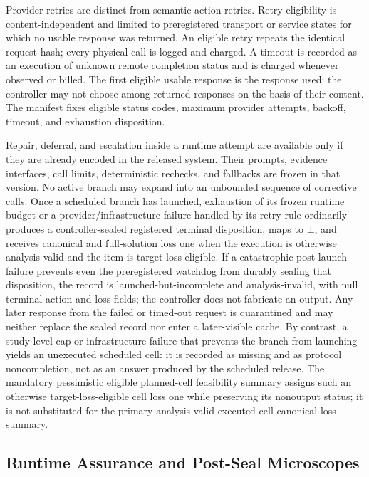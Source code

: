 \documentclass[10pt]{article} %
\providecommand{\1}{\mathbf{1}}  %
\theoremstyle{remark}
\theoremstyle{definition}
\begin{document}
Provider retries are distinct from semantic action retries. Retry eligibility is content-independent and limited to preregistered transport or service states for which no usable response was returned. An eligible retry repeats the identical request hash; every physical call is logged and charged. A timeout is recorded as an execution of unknown remote completion status and is charged whenever observed or billed. The first eligible usable response is the response used: the controller may not choose among returned responses on the basis of their content. The manifest fixes eligible status codes, maximum provider attempts, backoff, timeout, and exhaustion disposition.

Repair, deferral, and escalation inside a runtime attempt are available only if they are already encoded in the released system. Their prompts, evidence interfaces, call limits, deterministic rechecks, and fallbacks are frozen in that version. No active branch may expand into an unbounded sequence of corrective calls. Once a scheduled branch has launched, exhaustion of its frozen runtime budget or a provider/infrastructure failure handled by its retry rule ordinarily produces a controller-sealed registered terminal disposition, maps to $\bot$, and receives canonical and full-solution loss one when the execution is otherwise analysis-valid and the item is target-loss eligible. If a catastrophic post-launch failure prevents even the preregistered watchdog from durably sealing that disposition, the record is launched-but-incomplete and analysis-invalid, with null terminal-action and loss fields; the controller does not fabricate an output. Any later response from the failed or timed-out request is quarantined and may neither replace the sealed record nor enter a later-visible cache. By contrast, a study-level cap or infrastructure failure that prevents the branch from launching yields an unexecuted scheduled cell: it is recorded as missing and as protocol noncompletion, not as an answer produced by the scheduled release. The mandatory pessimistic eligible planned-cell feasibility summary assigns such an otherwise target-loss-eligible cell loss one while preserving its nonoutput status; it is not substituted for the primary analysis-valid executed-cell canonical-loss summary.

\subsection{Runtime Assurance and Post-Seal Microscopes}
\end{document}
